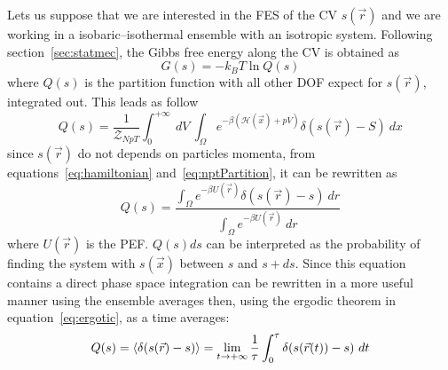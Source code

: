 Lets us suppose that we are interested in the \ac{FES} of the \ac{CV} $s(\vec r)$ and we are working in a isobaric--isothermal ensemble with an isotropic system. Following section~\ref{sec:statmec}, the Gibbs free energy along the \ac{CV} is obtained as
\begin{equation}
	G(s) = -k_BT \ln Q(s)
	\label{eq:fes}
\end{equation}
where $Q(s)$ is the partition function with all other \ac{DOF} expect for $s(\vec r)$, integrated out. This leads as follow
\begin{equation*}
	Q(s) = \frac{1}{\mathcal{Z}_{NpT}} \int_0^{+\infty}\ dV \ \int_\Omega e^{-\beta(\mathcal{H}(\vec x) + pV)}\delta(s(\vec r) - S)\ dx
\end{equation*}
since $s(\vec r)$ do not depends on particles momenta, from equations~\eqref{eq:hamiltonian} and~\eqref{eq:nptPartition}, it can be rewritten as
\begin{equation}
	Q(s) =  \frac{ \int_\Omega e^{-\beta U(\vec r)}\delta(s(\vec r) - s)\ dr }{\int_\Omega e^{-\beta U(\vec r)}\ dr}
	\label{eq:CVprobability}
\end{equation}
where $U(\vec r)$ is the \ac{PEF}. $Q(s)ds$ can be interpreted as the probability of finding the system with $s(\vec x)$ between $s$ and $s + ds$. Since this equation contains a direct phase space integration can be rewritten in a more useful manner using the ensemble averages then, using the ergodic theorem in equation~\eqref{eq:ergotic}, as a time averages:
\begin{equation}
	Q(s) = \left \langle \delta(s(\vec r) - s) \right \rangle = \lim_{t\to +\infty}\frac{1}{\tau}\int_0^\tau \delta(s(\vec r(t)) - s)\ dt
	\label{eq:CVprobabilityAve}
\end{equation}

